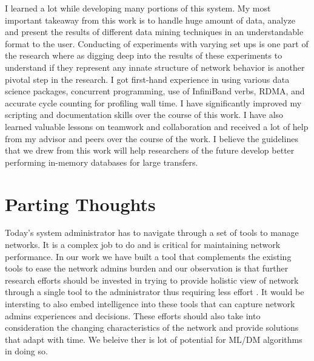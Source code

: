 I learned a lot while developing many portions of this system. My most important takeaway from this work is to handle huge amount of data, analyze and present the results of different data mining techniques in an understandable format to the user. Conducting of experiments with varying set ups is one part of the research where as digging deep into the results of these experiments to understand if they represent any innate structure of network behavior is another pivotal step in the research. 
I got first-hand experience in using various data science packages,  concurrent programming, use of InfiniBand verbs, RDMA, and accurate cycle counting 
for profiling wall time. I have significantly improved my scripting and documentation skills over the course of this work. 
I have also learned valuable lessons on teamwork and collaboration and received a lot of help from my advisor and peers over the course of the work. I believe the guidelines that we drew from this work will help researchers of the future develop better performing in-memory databases for large transfers. 

\section{Parting Thoughts}
Today's system administrator has to navigate through a set of tools to manage networks. It is a complex job to do and is critical for maintaining network performance. In our work we have built a tool that complements the existing tools to ease the network admins burden and our observation is that further research efforts should be invested in trying to provide holistic view of network through a single tool to the administrator thus requiring less effort . It would be intersting to also embed intelligence into these tools that can capture network admins experiences and decisions. These efforts should also take into consideration the changing characteristics of the network and provide solutions that adapt with time. We beleive ther is lot of potential for ML/DM algorithms in doing so.
